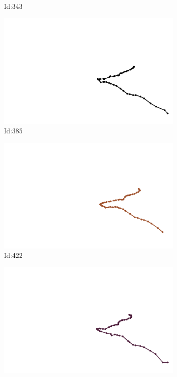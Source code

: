\documentclass[12pt,twoside]{report}
\begin{document}
\begin{figure}
\begin{subfigure}[b]{0.20\textwidth}
\caption{Id:343}
\end{subfigure}
\begin{subfigure}[b]{0.20\textwidth}
\centering
\includegraphics[width=\textwidth]{../../trajectories/385.png}
\caption{Id:385}
\end{subfigure}
\begin{subfigure}[b]{0.20\textwidth}
\centering
\includegraphics[width=\textwidth]{../../trajectories/422.png}
\caption{Id:422}
\end{subfigure}
\begin{subfigure}[b]{0.20\textwidth}
\centering
\includegraphics[width=\textwidth]{../../trajectories/634.png}

\end{subfigure}
\end{figure}
\end{document}
